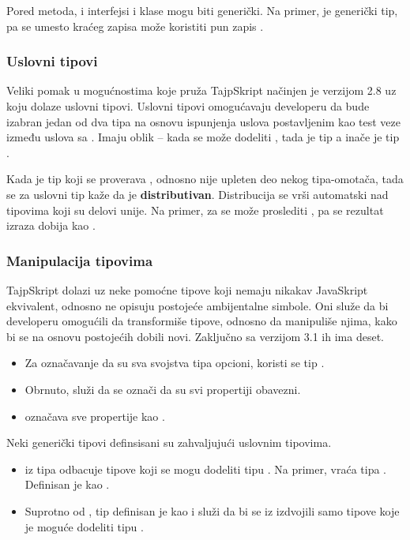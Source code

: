 Pored metoda, i interfejsi i klase mogu biti generički.
Na primer,  je generički tip, pa se umesto kraćeg zapisa  može koristiti pun zapis .

\subsubsection{Uslovni tipovi}

Veliki pomak u mogućnostima koje pruža TajpSkript načinjen je verzijom 2.8 uz koju dolaze uslovni tipovi.
Uslovni tipovi omogućavaju developeru da bude izabran jedan od dva tipa na osnovu ispunjenja uslova postavljenim kao test veze između uslova sa .
Imaju oblik  -- kada se  može dodeliti , tada je tip  a inače je tip .

Kada je tip koji se proverava , odnosno nije upleten deo nekog tipa-omotača, tada se za uslovni tip kaže da je \textbf{distributivan}.
Distribucija se vrši automatski nad tipovima koji su delovi unije.
Na primer, za  se može proslediti , pa se rezultat izraza  dobija kao .

\subsubsection{Manipulacija tipovima}

TajpSkript dolazi uz neke pomoćne tipove koji nemaju nikakav JavaSkript ekvivalent, odnosno ne opisuju postojeće ambijentalne simbole.
Oni služe da bi developeru omogućili da transformiše tipove, odnosno da manipuliše njima, kako bi se na osnovu postojećih dobili novi.
Zaključno sa verzijom 3.1 ih ima deset.

\begin{itemize}
\item Za označavanje da su sva svojstva tipa  opcioni, koristi se tip .
\item Obrnuto,  služi da se označi da su svi propertiji obavezni.
\item {} označava sve propertije kao .
\end{itemize}

Neki generički tipovi definsisani su zahvaljujući uslovnim tipovima.

\begin{itemize}
\item {} iz tipa  odbacuje tipove koji se mogu dodeliti tipu . Na primer,  vraća tipa . Definisan je kao .
\item Suprotno od , tip  definisan je kao  i služi da bi se iz  izdvojili samo tipove koje je moguće dodeliti tipu .
\end{itemize}

